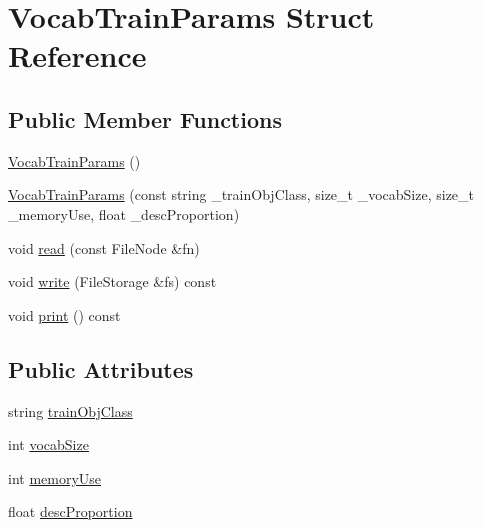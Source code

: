 \hypertarget{structVocabTrainParams}{\section{Vocab\-Train\-Params Struct Reference}
\label{structVocabTrainParams}
}
\subsection*{Public Member Functions}
\begin{DoxyCompactItemize}
\item 
\hyperlink{structVocabTrainParams_a9d482783255ca8ae138f1eb22d0fc5fa}{Vocab\-Train\-Params} ()
\item 
\hyperlink{structVocabTrainParams_adbc39fcef1545755b8a32cd532546c02}{Vocab\-Train\-Params} (const string \-\_\-train\-Obj\-Class, size\-\_\-t \-\_\-vocab\-Size, size\-\_\-t \-\_\-memory\-Use, float \-\_\-desc\-Proportion)
\item 
void \hyperlink{structVocabTrainParams_aa4fb87c424b7644299f6967648181357}{read} (const File\-Node \&fn)
\item 
void \hyperlink{structVocabTrainParams_ac10429fab83898d30bc380257f5ac79c}{write} (File\-Storage \&fs) const 
\item 
void \hyperlink{structVocabTrainParams_a70613056f11a4b1ebea8542cb390f768}{print} () const 
\end{DoxyCompactItemize}
\subsection*{Public Attributes}
\begin{DoxyCompactItemize}
\item 
string \hyperlink{structVocabTrainParams_a091823486f23d578abfbc45c16ee01db}{train\-Obj\-Class}
\item 
int \hyperlink{structVocabTrainParams_af674926f696f54c5016aaca00c5df491}{vocab\-Size}
\item 
int \hyperlink{structVocabTrainParams_a496bcb5542cfbea6363fc058de4e200e}{memory\-Use}
\item 
float \hyperlink{structVocabTrainParams_a826922a4a2c21733527b3dc09d06d6d0}{desc\-Proportion}
\end{DoxyCompactItemize}



